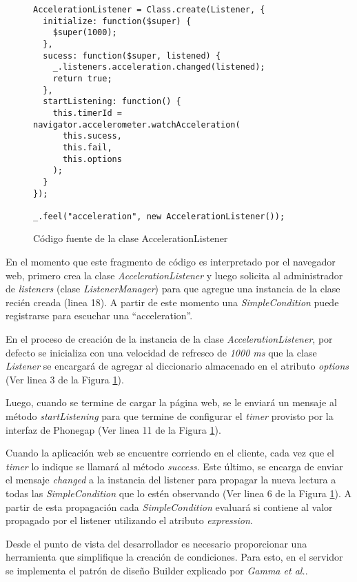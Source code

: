 \begin{figure}[ht!]
\begin{Verbatim}
AccelerationListener = Class.create(Listener, {
  initialize: function($super) {
    $super(1000);
  },
  sucess: function($super, listened) {
    _.listeners.acceleration.changed(listened);
    return true;
  },
  startListening: function() {
    this.timerId = navigator.accelerometer.watchAcceleration(
      this.sucess,
      this.fail,
      this.options
    );
  }
});

_.feel("acceleration", new AccelerationListener());
\end{Verbatim}
\caption{Código fuente de la clase AccelerationListener}
\label{AccelerationListenerClass}
\end{figure}

En el momento que este fragmento de código es interpretado por el navegador web, primero crea la clase \emph{AccelerationListener} y luego solicita al administrador de \emph{listeners} (clase \emph{ListenerManager}) para que agregue una instancia de la clase recién creada (linea 18). A partir de este momento una \emph{SimpleCondition} puede registrarse para escuchar una ``acceleration''.

En el proceso de creación de la instancia de la clase \emph{AccelerationListener}, por defecto se inicializa con una velocidad de refresco de \emph{1000 ms} que la clase \emph{Listener} se encargará de agregar al diccionario almacenado en el atributo \emph{options} (Ver linea 3 de la Figura \ref{AccelerationListenerClass}).

Luego, cuando se termine de cargar la página web, se le enviará un mensaje al método \emph{startListening} para que termine de configurar el \emph{timer} provisto por la interfaz de Phonegap (Ver linea 11 de la Figura \ref{AccelerationListenerClass}).

Cuando la aplicación web se encuentre corriendo en el cliente, cada vez que el \emph{timer} lo indique se llamará al método \emph{success}. Este último, se encarga de enviar el mensaje \emph{changed} a la instancia del listener para propagar la nueva lectura a todas las \emph{SimpleCondition} que lo estén observando (Ver linea 6 de la Figura \ref{AccelerationListenerClass}). A partir de esta propagación cada \emph{SimpleCondition} evaluará si contiene al valor propagado por el listener utilizando el atributo \emph{expression}.

Desde el punto de vista del desarrollador es necesario proporcionar una herramienta que simplifique la creación de condiciones. Para esto, en el servidor se implementa el patrón de diseño Builder explicado por \emph{Gamma et al.}\cite{Gamma95}.

